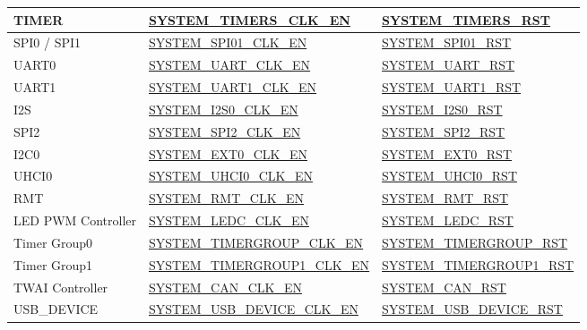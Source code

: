 \documentclass[main\_\_EN.tex]{subfiles}
\begin{document}
\begin{ThreePartTable}
\begin{longtable}[c]{ |l|l|l| }
    TIMER    & \hyperref[fielddesc:SYSTEMTIMERSCLKEN]{SYSTEM\_TIMERS\_CLK\_EN} & \hyperref[fielddesc:SYSTEMTIMERSRST]{SYSTEM\_TIMERS\_RST} \\\hline
    SPI0 / SPI1     & \hyperref[fielddesc:SYSTEMSPI01CLKEN]{SYSTEM\_SPI01\_CLK\_EN}         & \hyperref[fielddesc:SYSTEMSPI01RST]{SYSTEM\_SPI01\_RST} \\\hline
    UART0           & \hyperref[fielddesc:SYSTEMUARTCLKEN]{SYSTEM\_UART\_CLK\_EN}          & \hyperref[fielddesc:SYSTEMUARTRST]{SYSTEM\_UART\_RST} \\\hline
    UART1           & \hyperref[fielddesc:SYSTEMUART1CLKEN]{SYSTEM\_UART1\_CLK\_EN}         & \hyperref[fielddesc:SYSTEMUART1RST]{SYSTEM\_UART1\_RST} \\\hline
    I2S             & \hyperref[fielddesc:SYSTEMI2S0CLKEN]{SYSTEM\_I2S0\_CLK\_EN}         & \hyperref[fielddesc:SYSTEMI2S0RST]{SYSTEM\_I2S0\_RST} \\\hline
    SPI2            & \hyperref[fielddesc:SYSTEMSPI2CLKEN]{SYSTEM\_SPI2\_CLK\_EN}          & \hyperref[fielddesc:SYSTEMSPI2RST]{SYSTEM\_SPI2\_RST} \\\hline
    I2C0            & \hyperref[fielddesc:SYSTEMEXT0CLKEN]{SYSTEM\_EXT0\_CLK\_EN}          & \hyperref[fielddesc:SYSTEMEXT0RST]{SYSTEM\_EXT0\_RST} \\\hline
    UHCI0           & \hyperref[fielddesc:SYSTEMUHCI0CLKEN]{SYSTEM\_UHCI0\_CLK\_EN}         & \hyperref[fielddesc:SYSTEMUHCI0RST]{SYSTEM\_UHCI0\_RST} \\\hline
    RMT             & \hyperref[fielddesc:SYSTEMRMTCLKEN]{SYSTEM\_RMT\_CLK\_EN}           & \hyperref[fielddesc:SYSTEMRMTRST]{SYSTEM\_RMT\_RST} \\\hline
    LED PWM Controller & \hyperref[fielddesc:SYSTEMLEDCCLKEN]{SYSTEM\_LEDC\_CLK\_EN}          & \hyperref[fielddesc:SYSTEMLEDCRST]{SYSTEM\_LEDC\_RST} \\\hline
    Timer Group0    & \hyperref[fielddesc:SYSTEMTIMERGROUPCLKEN]{SYSTEM\_TIMERGROUP\_CLK\_EN} & \hyperref[fielddesc:SYSTEMTIMERGROUPRST]{SYSTEM\_TIMERGROUP\_RST} \\\hline
    Timer Group1    & \hyperref[fielddesc:SYSTEMTIMERGROUP1CLKEN]{SYSTEM\_TIMERGROUP1\_CLK\_EN} & \hyperref[fielddesc:SYSTEMTIMERGROUP1RST]{SYSTEM\_TIMERGROUP1\_RST} \\\hline
    TWAI Controller    & \hyperref[fielddesc:SYSTEMCANCLKEN]{SYSTEM\_CAN\_CLK\_EN} & \hyperref[fielddesc:SYSTEMCANRST]{SYSTEM\_CAN\_RST} \\\hline
    USB\_DEVICE    & \hyperref[fielddesc:SYSTEMUSBDEVICECLKEN]{SYSTEM\_USB\_DEVICE\_CLK\_EN} & \hyperref[fielddesc:SYSTEMUSBDEVICERST]{SYSTEM\_USB\_DEVICE\_RST} \\\hline

\end{longtable}
\end{ThreePartTable}
\end{document}

